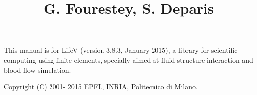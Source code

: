 \documentclass[a4paper, 12pt, report]{lifestyle}
\title{\lifetitle{LifeV User Manual}
{G. Fourestey, S. Deparis}
}
\date{}
\begin{document}
\maketitle

\phantom{dummy text}
\vfill
This manual is for LifeV (version 3.8.3, January 2015),
a library for scientific computing
using finite elements, specially aimed at fluid-structure interaction and blood flow simulation.

Copyright (C) 2001- 2015 EPFL, INRIA, Politecnico di Milano.

\tableofcontents


\listoftables




%




\end{document}
